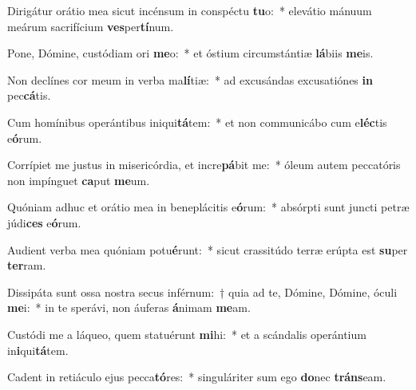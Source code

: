 \item Dirigátur orátio mea sicut incénsum in conspéctu \textbf{tu}o:~* elevátio mánuum meárum sacrifícium \textbf{ves}per\textbf{tí}num.
\item Pone, Dómine, custódiam ori \textbf{me}o:~* et óstium circumstántiæ \textbf{lá}biis \textbf{me}is.
\item Non declínes cor meum in verba ma\textbf{lí}tiæ:~* ad excusándas excusatiónes \textbf{in} pec\textbf{cá}tis.
\item Cum homínibus operántibus iniqui\textbf{tá}tem:~* et non communicábo cum e\textbf{léc}tis e\textbf{ó}rum.
\item Corrípiet me justus in misericórdia, et incre\textbf{pá}bit me:~* óleum autem peccatóris non impínguet \textbf{ca}put \textbf{me}um.
\item Quóniam adhuc et orátio mea in beneplácitis e\textbf{ó}rum:~* absórpti sunt juncti petræ júdi\textbf{ces} e\textbf{ó}rum.
\item Audient verba mea quóniam potu\textbf{é}runt:~* sicut crassitúdo terræ erúpta est \textbf{su}per \textbf{ter}ram.
\item Dissipáta sunt ossa nostra secus inférnum:~† quia ad te, Dómine, Dómine, óculi \textbf{me}i:~* in te sperávi, non áuferas \textbf{á}nimam \textbf{me}am.
\item Custódi me a láqueo, quem statuérunt \textbf{mi}hi:~* et a scándalis operántium in\textbf{i}qui\textbf{tá}tem.
\item Cadent in retiáculo ejus pecca\textbf{tó}res:~* singuláriter sum ego \textbf{do}nec \textbf{tráns}eam.
